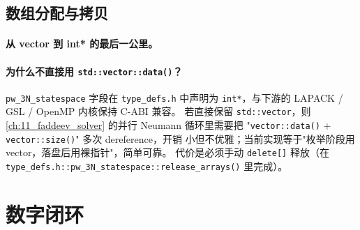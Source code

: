 \subsection{数组分配与拷贝}
\label{subsec:ch07-array-alloc}

\paragraph{从 vector 到 int* 的最后一公里。}


\paragraph{为什么不直接用 \texttt{std::vector::data()}？}
\texttt{pw\_3N\_statespace} 字段在 \texttt{type\_defs.h} 中声明为
\texttt{int*}，与下游的 LAPACK / GSL / OpenMP 内核保持 C-ABI 兼容。
若直接保留 \texttt{std::vector}，则
\cref{ch:11_faddeev_solver} 的并行 Neumann 循环里需要把
"\texttt{vector::data()} + \texttt{vector::size()}" 多次 dereference，开销
小但不优雅；当前实现等于"枚举阶段用 vector，落盘后用裸指针"，简单可靠。
代价是必须手动 \verb|delete[]| 释放（在
\texttt{type\_defs.h::pw\_3N\_statespace::release\_arrays()} 里完成）。

\section{数字闭环}
\label{sec:ch07-numerics}

